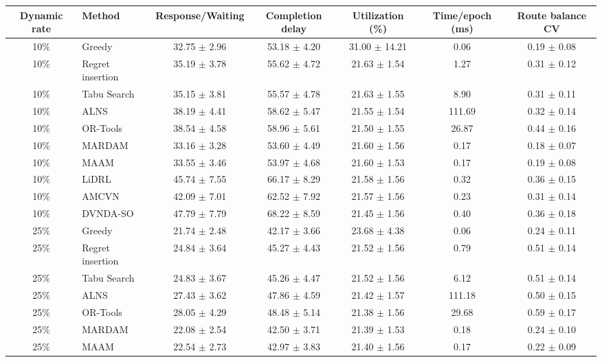 \begin{tabular}{clccccc}
\toprule
Dynamic rate & Method & Response/Waiting & Completion delay & Utilization (\%) & Time/epoch (ms) & Route balance CV \\
\midrule
10\% & Greedy & 32.75 $\pm$ 2.96 & 53.18 $\pm$ 4.20 & 31.00 $\pm$ 14.21 & 0.06 & 0.19 $\pm$ 0.08 \\
10\% & Regret insertion & 35.19 $\pm$ 3.78 & 55.62 $\pm$ 4.72 & 21.63 $\pm$ 1.54 & 1.27 & 0.31 $\pm$ 0.12 \\
10\% & Tabu Search & 35.15 $\pm$ 3.81 & 55.57 $\pm$ 4.78 & 21.63 $\pm$ 1.55 & 8.90 & 0.31 $\pm$ 0.11 \\
10\% & ALNS & 38.19 $\pm$ 4.41 & 58.62 $\pm$ 5.47 & 21.55 $\pm$ 1.54 & 111.69 & 0.32 $\pm$ 0.14 \\
10\% & OR-Tools & 38.54 $\pm$ 4.58 & 58.96 $\pm$ 5.61 & 21.50 $\pm$ 1.55 & 26.87 & 0.44 $\pm$ 0.16 \\
10\% & MARDAM & 33.16 $\pm$ 3.28 & 53.60 $\pm$ 4.49 & 21.60 $\pm$ 1.56 & 0.17 & 0.18 $\pm$ 0.07 \\
10\% & MAAM & 33.55 $\pm$ 3.46 & 53.97 $\pm$ 4.68 & 21.60 $\pm$ 1.53 & 0.17 & 0.19 $\pm$ 0.08 \\
10\% & LiDRL & 45.74 $\pm$ 7.55 & 66.17 $\pm$ 8.29 & 21.58 $\pm$ 1.56 & 0.32 & 0.36 $\pm$ 0.15 \\
10\% & AMCVN & 42.09 $\pm$ 7.01 & 62.52 $\pm$ 7.92 & 21.57 $\pm$ 1.56 & 0.23 & 0.31 $\pm$ 0.14 \\
10\% & DVNDA-SO & 47.79 $\pm$ 7.79 & 68.22 $\pm$ 8.59 & 21.45 $\pm$ 1.56 & 0.40 & 0.36 $\pm$ 0.18 \\
25\% & Greedy & 21.74 $\pm$ 2.48 & 42.17 $\pm$ 3.66 & 23.68 $\pm$ 4.38 & 0.06 & 0.24 $\pm$ 0.11 \\
25\% & Regret insertion & 24.84 $\pm$ 3.64 & 45.27 $\pm$ 4.43 & 21.52 $\pm$ 1.56 & 0.79 & 0.51 $\pm$ 0.14 \\
25\% & Tabu Search & 24.83 $\pm$ 3.67 & 45.26 $\pm$ 4.47 & 21.52 $\pm$ 1.56 & 6.12 & 0.51 $\pm$ 0.14 \\
25\% & ALNS & 27.43 $\pm$ 3.62 & 47.86 $\pm$ 4.59 & 21.42 $\pm$ 1.57 & 111.18 & 0.50 $\pm$ 0.15 \\
25\% & OR-Tools & 28.05 $\pm$ 4.29 & 48.48 $\pm$ 5.14 & 21.38 $\pm$ 1.56 & 29.68 & 0.59 $\pm$ 0.17 \\
25\% & MARDAM & 22.08 $\pm$ 2.54 & 42.50 $\pm$ 3.71 & 21.39 $\pm$ 1.53 & 0.18 & 0.24 $\pm$ 0.10 \\
25\% & MAAM & 22.54 $\pm$ 2.73 & 42.97 $\pm$ 3.83 & 21.40 $\pm$ 1.56 & 0.17 & 0.22 $\pm$ 0.09 \\

\end{tabular}
